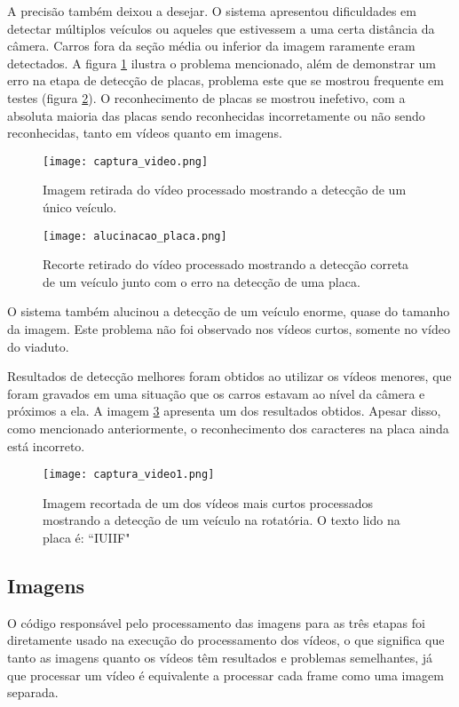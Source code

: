 \documentclass[conference]{IEEEtran}
\begin{document}
A precisão também deixou a desejar. O sistema apresentou dificuldades em detectar múltiplos veículos ou aqueles que estivessem a uma certa distância da câmera.
Carros fora da seção média ou inferior da imagem raramente eram detectados.
A figura \ref{fig:carro_longe} ilustra o problema mencionado, além de demonstrar um erro na etapa de detecção de placas, problema este que se mostrou frequente em testes (figura \ref{fig:alucinacao_placa}).
O reconhecimento de placas se mostrou inefetivo, com a absoluta maioria das placas sendo reconhecidas incorretamente ou não sendo reconhecidas, tanto em vídeos quanto em imagens.

\begin{figure}
    \centering
    \texttt{[image: captura\_video.png]}
    \caption{Imagem retirada do vídeo processado mostrando a detecção de um único veículo.}
    \label{fig:carro_longe}
\end{figure}

\begin{figure}
    \centering
    \texttt{[image: alucinacao\_placa.png]}
    \caption{Recorte retirado do vídeo processado mostrando a detecção correta de um veículo junto com o erro na detecção de uma placa.}
    \label{fig:alucinacao_placa}
\end{figure}

O sistema também alucinou a detecção de um veículo enorme, quase do tamanho da imagem. Este problema não foi observado nos vídeos curtos, somente no vídeo do viaduto.

Resultados de detecção melhores foram obtidos ao utilizar os vídeos menores, que foram gravados em uma situação que os carros estavam ao nível da câmera e próximos a ela.
A imagem \ref{fig:carro_perto} apresenta um dos resultados obtidos.
Apesar disso, como mencionado anteriormente, o reconhecimento dos caracteres na placa ainda está incorreto.

\begin{figure}
    \centering
    \texttt{[image: captura\_video1.png]}
    \caption{Imagem recortada de um dos vídeos mais curtos processados mostrando a detecção de um veículo na rotatória. O texto lido na placa é: ``IUIIF"}
    \label{fig:carro_perto}
\end{figure}


\subsection{Imagens}
O código responsável pelo processamento das imagens para as três etapas foi diretamente usado na execução do processamento dos vídeos, o que significa que tanto as imagens quanto os vídeos têm resultados e problemas semelhantes, já que processar um vídeo é equivalente a processar cada frame como uma imagem separada.
\end{document}
